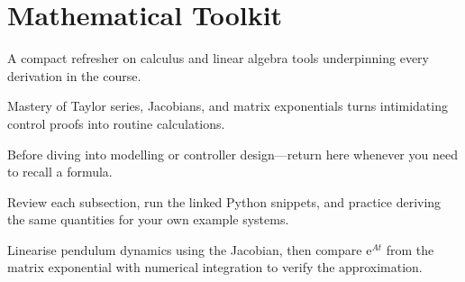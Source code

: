 \section{Mathematical Toolkit}
\begin{beginnerguide}
    \item[\textbf{What?}] A compact refresher on calculus and linear algebra tools underpinning every derivation in the course.
    \item[\textbf{Why?}] Mastery of Taylor series, Jacobians, and matrix exponentials turns intimidating control proofs into routine calculations.
    \item[\textbf{When?}] Before diving into modelling or controller design—return here whenever you need to recall a formula.
    \item[\textbf{How?}] Review each subsection, run the linked Python snippets, and practice deriving the same quantities for your own example systems.
    \item[\textbf{Example}] Linearise pendulum dynamics using the Jacobian, then compare $\mathrm{e}^{A t}$ from the matrix exponential with numerical integration to verify the approximation.
\end{beginnerguide}
